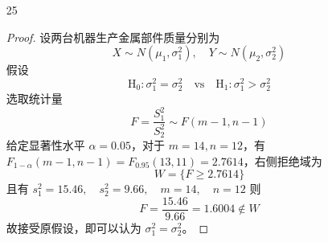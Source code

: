 \documentclass[normal,cn]{elegantnote}
\begin{document}
\begin{enumerate}
\begin{proof}
\begin{equation*}
            \end{equation*}
            双侧拒绝域为 $W=\{F\leq 0.2041\text{ 或 }F\geq 4.53\}$，且有 $s_{x}^{2}=0.3091^{2},\quad s_{y}^{2}=0.1616^{2}$，则
            \begin{equation*}
                F=\frac{0.3091^{2}}{0.1616^{2}}=3.6590 \notin W
            \end{equation*}
            并且检验的 $p$ 值 $p=2 P\{F \geq 3.6591\}=0.0892>\alpha=0.05$，故接受 $\mathrm{H}_{0}$，拒绝 $\mathrm{H}_{1}$，即可以认为两台车床生产的滚珠直径的方差没有明显差异。
        \end{proof}
    \item[25]
        \begin{proof}
            设两台机器生产金属部件质量分别为
            \begin{equation*}
                X\sim N\left(\mu_{1},\sigma_{1}^{2}\right),\quad Y\sim N\left(\mu_{2},\sigma_{2}^{2}\right)
            \end{equation*}
            假设
            \begin{equation*}
                \mathrm{H}_{0}:\sigma_{1}^{2}=\sigma_{2}^{2}\quad\text{vs}\quad\mathrm{H}_{1}:\sigma_{1}^{2}>\sigma_{2}^{2}
            \end{equation*}
            选取统计量
            \begin{equation*}
                F=\frac{S_{1}^{2}}{S_{2}^{2}}\sim F(m-1,n-1)
            \end{equation*}
            给定显著性水平 $\alpha=0.05$，对于 $m=14,n=12$，有 $F_{1-\alpha}(m-1,n-1)=F_{0.95}(13,11)=2.7614$，右侧拒绝域为
            \begin{equation*}
                W=\{F\geq 2.7614\}
            \end{equation*}
            且有 $s_{1}^{2}=15.46,\quad s_{2}^{2}=9.66,\quad m=14,\quad n=12$
            则
            \begin{equation*}
                F=\frac{15.46}{9.66}=1.6004\notin W
            \end{equation*}
            故接受原假设，即可以认为 $\sigma_{1}^{2}=\sigma_{2}^{2}$。
        \end{proof}
\end{enumerate}
\end{document}
